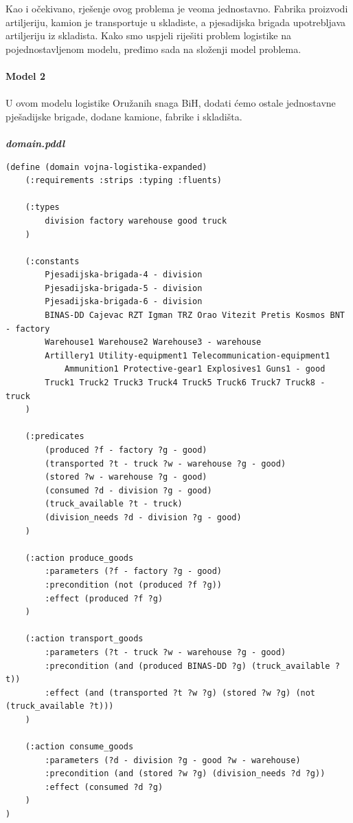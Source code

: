 \documentclass{article}
\begin{document}
\noindent
Kao i očekivano, rješenje ovog problema je veoma jednostavno. Fabrika proizvodi artiljeriju, kamion je transportuje u skladiste, a pjesadijska brigada upotrebljava artiljeriju iz skladista. Kako smo uspjeli riješiti problem logistike na pojednostavljenom modelu, pređimo sada na složenji model problema.\\~\\

\Large
\noindent
\textbf{Model 2}
\\~\\
\normalsize 
U ovom modelu logistike Oružanih snaga BiH, dodati ćemo ostale jednostavne pješadijske brigade, dodane kamione, fabrike i skladišta.
\\~\\
\textbf{\textit{domain.pddl}}
\begin{verbatim}
(define (domain vojna-logistika-expanded)
    (:requirements :strips :typing :fluents)

    (:types
        division factory warehouse good truck
    )

    (:constants
        Pjesadijska-brigada-4 - division
        Pjesadijska-brigada-5 - division
        Pjesadijska-brigada-6 - division
        BINAS-DD Cajevac RZT Igman TRZ Orao Vitezit Pretis Kosmos BNT - factory
        Warehouse1 Warehouse2 Warehouse3 - warehouse
        Artillery1 Utility-equipment1 Telecommunication-equipment1  
            Ammunition1 Protective-gear1 Explosives1 Guns1 - good
        Truck1 Truck2 Truck3 Truck4 Truck5 Truck6 Truck7 Truck8 - truck
    )

    (:predicates
        (produced ?f - factory ?g - good)
        (transported ?t - truck ?w - warehouse ?g - good)
        (stored ?w - warehouse ?g - good)
        (consumed ?d - division ?g - good)
        (truck_available ?t - truck)
        (division_needs ?d - division ?g - good)
    )

    (:action produce_goods
        :parameters (?f - factory ?g - good)
        :precondition (not (produced ?f ?g))
        :effect (produced ?f ?g)
    )

    (:action transport_goods
        :parameters (?t - truck ?w - warehouse ?g - good)
        :precondition (and (produced BINAS-DD ?g) (truck_available ?t))
        :effect (and (transported ?t ?w ?g) (stored ?w ?g) (not (truck_available ?t)))
    )

    (:action consume_goods
        :parameters (?d - division ?g - good ?w - warehouse)
        :precondition (and (stored ?w ?g) (division_needs ?d ?g))
        :effect (consumed ?d ?g)
    )
)

\end{verbatim}
\end{document}
